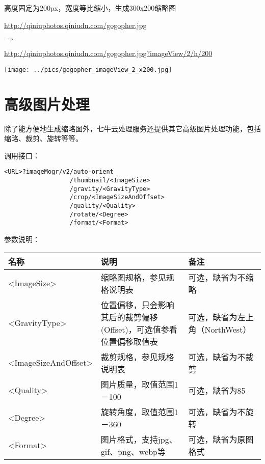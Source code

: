\documentclass[11pt, oneside]{book}
\newcommand{\qpar}[1]{
\vspace{0.25em}
\noindent
#1\par
\vspace{0.25em}
}
\newcommand{\qurl}[1]{\url{#1}}
\newcommand{\qtable}[1]{\footnotesize\vspace{0.5em}#1\vspace{0.5em}\normalsize}
\begin{document}
\begin{CJK*}{UTF8}{song}
\begin{sample}
  \caption{高度固定为200px，宽度等比缩小，生成300x200缩略图}
    \qpar{\qurl{http://qiniuphotos.qiniudn.com/gogopher.jpg}}
    \qpar{$\Rightarrow$}
    \qpar{\qurl{http://qiniuphotos.qiniudn.com/gogopher.jpg?imageView/2/h/200}}

    \begin{center}
      \texttt{[image: ../pics/gogopher\_imageView\_2\_x200.jpg]}
    \end{center}
  \label{imageView-2-x200}
\end{sample}

\clearpage

\section{高级图片处理}

\qpar{除了能方便地生成缩略图外，七牛云处理服务还提供其它高级图片处理功能，包括缩略、裁剪、旋转等等。}
\qpar{调用接口：}
\begin{lstlisting}[basicstyle=\ttfamily\footnotesize]
<URL>?imageMogr/v2/auto-orient
                  /thumbnail/<ImageSize>
                  /gravity/<GravityType>
                  /crop/<ImageSizeAndOffset>
                  /quality/<Quality>
                  /rotate/<Degree>
                  /format/<Format>
\end{lstlisting}

\qpar{参数说明：}
\qtable{
\def\arraystretch{2}
\begin{tabular}{|l|p{18em}|p{10em}|}
\hline
名称 & 说明 & 备注\\
\hline
\textless ImageSize\textgreater & 缩略图规格，参见规格说明表 & 可选，缺省为不缩略 \\
\hline
\textless GravityType\textgreater & 位置偏移，只会影响其后的裁剪偏移(Offset)，可选值参看位置偏移取值表 & 可选，缺省为左上角（NorthWest） \\
\hline
\textless ImageSizeAndOffset\textgreater & 裁剪规格，参见规格说明表 & 可选，缺省为不裁剪 \\
\hline
\textless Quality\textgreater & 图片质量，取值范围1－100 & 可选，缺省为85 \\
\hline
\textless Degree\textgreater & 旋转角度，取值范围1－360 & 可选，缺省为不旋转 \\
\hline
\textless Format\textgreater & 图片格式，支持jpg、gif、png、webp等 & 可选，缺省为原图格式 \\
\hline
\end{tabular}
}


\end{CJK*}
\end{document}
